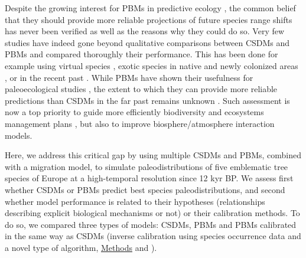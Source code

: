 \documentclass[pdflatex, sn-nature]{sn-jnl}%
\begin{document}
Despite the growing interest for PBMs in predictive ecology \cite{Connolly2017, Urban2016, Pilowsky2022}, the common belief that they should provide more reliable projections of future species range shifts has never been verified as well as the reasons why they could do so. Very few studies have indeed gone beyond qualitative comparisons between CSDMs and PBMs and compared thoroughly their performance. This has been done for example using virtual species \cite{Zurell2016}, exotic species in native and newly colonized areas \cite{Higgins2020}, or in the recent past \cite{Fordham2018}. While PBMs have shown their usefulness for paleoecological studies \cite{Saltre2013, Ruosch2016, Schwoerer2014}, the extent to which they can provide more reliable predictions than CSDMs in the far past remains unknown \cite{UribeRivera2022, Briscoe2019}. Such assessment is now a top priority to guide more efficiently biodiversity and ecosystems management plans \cite{Pacifici2015}, but also to improve biosphere/atmosphere interaction models.

Here, we address this critical gap by using multiple CSDMs and PBMs, combined with a migration model, to simulate paleodistributions of five emblematic tree species of Europe at a high-temporal resolution since 12 kyr BP. We assess first whether CSDMs or PBMs predict best species paleodistributions, and second whether model performance is related to their hypotheses (relationships describing explicit biological mechanisms or not) or their calibration methods. To do so, we compared three types of models: CSDMs, PBMs and PBMs calibrated in the same way as CSDMs (inverse calibration using species occurrence data and a novel type of algorithm, \hyperref[methods]{Methods} and \citep{VanderMeersch2023}). 
\end{document}

